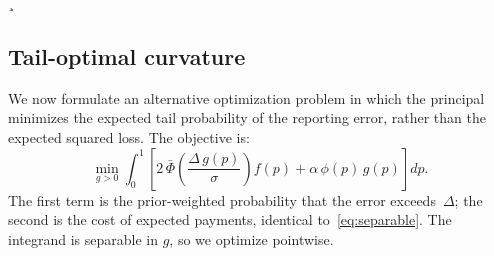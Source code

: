 \documentclass[11pt]{article}
\begin{document}
¸
\subsection{Tail-optimal curvature}\label{sec:tail-optimal}

We now formulate an alternative optimization problem in which the principal minimizes the expected tail probability of the reporting error, rather than the expected squared loss. The objective is:
\begin{equation}\label{eq:tail-objective}
\min_{g > 0} \int_0^1 \left[2\,\bar{\Phi}\!\left(\frac{\Delta\,g(p)}{\sigma}\right) f(p) + \alpha\,\phi(p)\,g(p)\right] dp.
\end{equation}
The first term is the prior-weighted probability that the error exceeds~$\Delta$; the second is the cost of expected payments, identical to~\eqref{eq:separable}. The integrand is separable in $g$, so we optimize pointwise.
\end{document}
